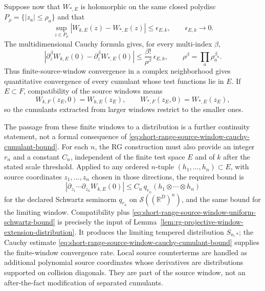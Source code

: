 Suppose now that \(W_{\ast,E}\) is holomorphic on the same closed polydisc
\(P_\rho=\{|z_a|\le\rho_a\}\) and that
\begin{equation}
  \sup_{z\in P_\rho}|W_{k,E}(z)-W_{\ast,E}(z)|
  \leq \epsilon_{E,k},
  \qquad \epsilon_{E,k}\longrightarrow0 .
  \label{eq:short-range-source-window-uniform-convergence}
\end{equation}
The multidimensional Cauchy formula gives, for every multi-index \(\beta\),
\begin{equation}
  \left|
    \partial_z^\beta W_{k,E}(0)
    -
    \partial_z^\beta W_{\ast,E}(0)
  \right|
  \leq
  \frac{\beta!}{\rho^\beta}\,\epsilon_{E,k},
  \qquad
  \rho^\beta=\prod_a\rho_a^{\beta_a}.
  \label{eq:short-range-source-window-cauchy-cumulant-bound}
\end{equation}
Thus finite-source-window convergence in a complex neighborhood gives
quantitative convergence of every cumulant whose test functions lie in
\(E\).  If \(E\subset F\), compatibility of the source windows means
\[
  W_{k,F}(z_E,0)=W_{k,E}(z_E),
  \qquad
  W_{\ast,F}(z_E,0)=W_{\ast,E}(z_E),
\]
so the cumulants extracted from larger windows restrict to the smaller ones.

The passage from these finite windows to a distribution is a further
continuity statement, not a formal consequence of
\eqref{eq:short-range-source-window-cauchy-cumulant-bound}.  For each
\(n\), the RG construction must also provide an integer \(r_n\) and a
constant \(C_n\), independent of the finite test space \(E\) and of \(k\)
after the stated scale threshold.  Applied to any ordered \(n\)-tuple
\((h_1,\ldots,h_n)\subset E\), with source coordinates \(z_1,\ldots,z_n\)
chosen in those directions, the required bound is
\begin{equation}
  \left|
    \partial_{z_1}\cdots\partial_{z_n}
    W_{k,E}(0)
  \right|
  \leq
  C_n\,
  q_{r_n}(h_1\otimes\cdots\otimes h_n)
  \label{eq:short-range-source-window-uniform-schwartz-bound}
\end{equation}
for the declared Schwartz seminorm \(q_{r_n}\) on
\(\mathcal S((\mathbb R^D)^n)\), and the same bound for the limiting window.
Compatibility plus
\eqref{eq:short-range-source-window-uniform-schwartz-bound} is precisely the
input of Lemma~\ref{lem:rg-projective-window-extension-distribution}.  It
produces the limiting tempered distribution \(S_{n,\ast}\); the Cauchy
estimate
\eqref{eq:short-range-source-window-cauchy-cumulant-bound} supplies the
finite-window convergence rate.  Local source counterterms are handled as
additional polynomial source coordinates whose derivatives are distributions
supported on collision diagonals.  They are part of the source window, not an
after-the-fact modification of separated cumulants.

